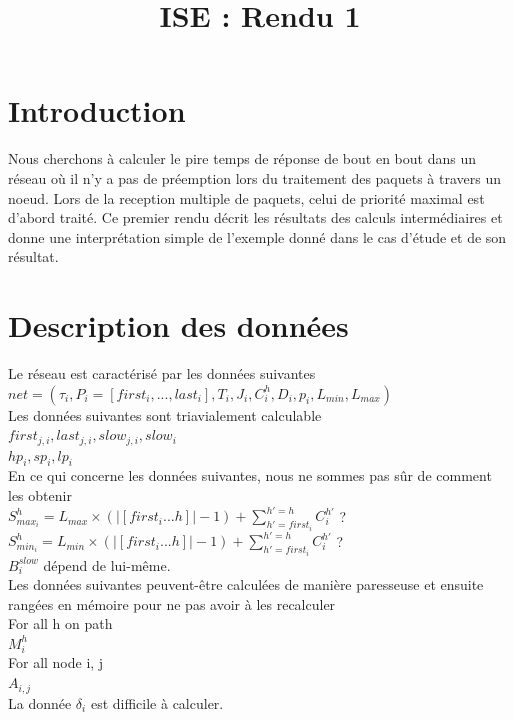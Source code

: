 \documentclass[10pt,a4paper]{article}
\title{ISE : Rendu 1}
\begin{document}
\maketitle

\section{Introduction}
Nous cherchons à calculer le pire temps de réponse de bout en bout dans un réseau où il n'y a pas de préemption lors du traitement des paquets à travers un noeud. Lors de la reception multiple de paquets, celui de priorité maximal est d'abord traité. Ce premier rendu décrit les résultats des calculs intermédiaires et donne une interprétation simple de l'exemple donné dans le cas d'étude et de son résultat.

\section{Description des données}
Le réseau est caractérisé par les données suivantes\\
$net=(\tau_i, P_i = [first_i,...,last_i], T_i, J_i, C_i^h, D_i, p_i, L_{min}, L_{max})$\\

Les données suivantes sont triavialement calculable\\
$first_{j,i}, last_{j,i}, slow_{j,i}, slow_i$\\
$hp_i, sp_i, lp_i$\\

En ce qui concerne les données suivantes, nous ne sommes pas sûr de comment les obtenir\\
$S_{max_i}^h = L_{max} \times (|[first_i ... h]| - 1) + \sum \limits_{h'=first_i}^{h'=h}C_i^{h'}$ ?\\
$S_{min_i}^h = L_{min} \times (|[first_i ... h]| - 1) + \sum \limits_{h'=first_i}^{h'=h}C_i^{h'}$ ?\\
$B_{i}^{slow}$ dépend de lui-même.\\

Les données suivantes peuvent-être calculées de manière paresseuse et ensuite rangées en mémoire pour ne pas avoir à les recalculer\\
For all h on path\\
$M_i^{h}$\\
For all node i, j\\
$A_{i,j}$\\

La donnée $\delta_i$ est difficile à calculer.\\
\end{document}
